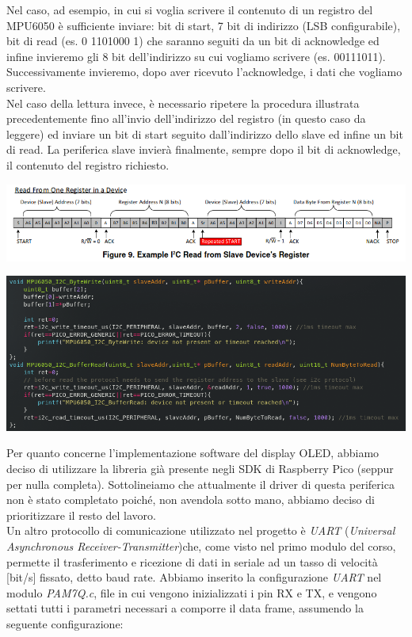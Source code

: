 \noindent Nel caso, ad esempio, in cui si voglia scrivere il contenuto di un
registro del MPU6050 è sufficiente inviare: bit di start, 7 bit di
indirizzo (LSB configurabile), bit di read (es. 0 1101000 1) che saranno
seguiti da un bit di acknowledge ed infine invieremo gli 8 bit
dell'indirizzo su cui vogliamo scrivere (es. 00111011). Successivamente
invieremo, dopo aver ricevuto l'acknowledge, i dati che vogliamo
scrivere.\\
Nel caso della lettura invece, è necessario ripetere la procedura
illustrata precedentemente fino all'invio dell'indirizzo del registro
(in questo caso da leggere) ed inviare un bit di start seguito
dall'indirizzo dello slave ed infine un bit di read. La periferica slave
invierà finalmente, sempre dopo il bit di acknowledge, il contenuto del
registro richiesto.

\begin{center}
\includegraphics[scale=0.65]{figures/image39.png}
\captionsetup{type=figure}
\end{center}

\begin{center}
\includegraphics[scale=0.65]{figures/image35.png}
\captionsetup{type=figure}
\end{center}

\noindent Per quanto concerne l'implementazione software del display OLED, abbiamo
deciso di utilizzare la libreria già presente negli SDK di Raspberry
Pico (seppur per nulla completa). Sottolineiamo che attualmente il
driver di questa periferica non è stato completato poiché, non avendola
sotto mano, abbiamo deciso di prioritizzare il resto del lavoro.\\
Un altro protocollo di comunicazione utilizzato nel progetto è
\emph{UART} (\emph{Universal Asynchronous Receiver-Transmitter})che, come
visto nel primo modulo del corso, permette il trasferimento e ricezione
di dati in seriale ad un tasso di velocità [bit/s] fissato, detto baud
rate. Abbiamo inserito la configurazione \emph{UART} nel modulo
\emph{PAM7Q.c}, file in cui vengono inizializzati i pin RX e TX, e
vengono settati tutti i parametri necessari a comporre il data frame,
assumendo la seguente configurazione:

